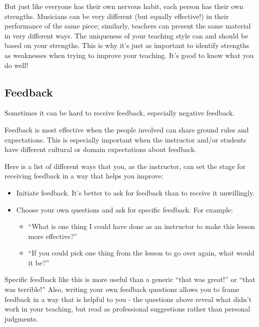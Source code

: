 But just like everyone has their own nervous habit, each person has their own
strengths.  Musicians can be very different (but equally effective!)
in their performance of the same piece; similarly, teachers can present the same material
in very different ways.  The uniqueness of your teaching style can and should
be based on your strengths.  This is why it's just as important to identify strengths
as weaknesses when trying to improve your teaching.  It's good to know what you do well!

\subsection*{Feedback}

Sometimes it can be hard to receive feedback, especially negative feedback.

Feedback is most effective when the people involved
can share ground rules and expectations.  This is especially important
when the instructor and/or students have different cultural or
domain expectations about feedback.

Here is a list of different
ways that you, as the instructor, can set the stage for receiving feedback
in a way that helps you improve:

\begin{itemize}
\item Initiate feedback.  It's better to ask for feedback than to receive it unwillingly.
\item Choose your own questions and ask for specific feedback.  For example:

\begin{itemize}
\item ``What is one thing I could have done as an instructor to make this
lesson more effective?''
\item ``If you could pick one thing from the lesson to go over again, what
would it be?''
\end{itemize}
\end{itemize}

Specific feedback like this is more useful than a generic ``that was great!'' or ``that
was terrible!''  Also, writing your own feedback questions allows you to frame
feedback in a way that is helpful to you - the questions above
reveal what didn't work in your teaching, but
read as professional suggestions rather than personal judgments.

